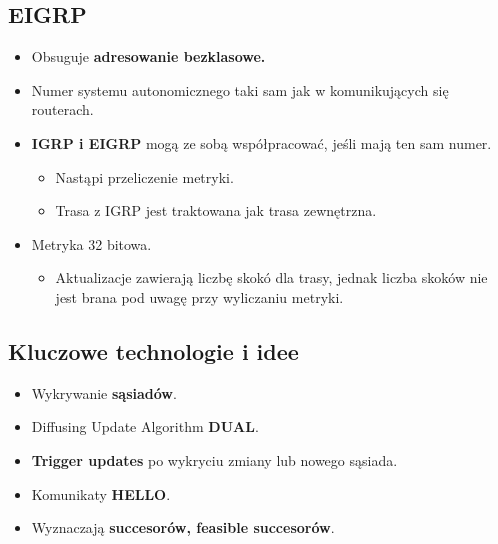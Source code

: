 \documentclass[../sk-egzamin.tex]{subfiles}
\begin{document}

\subsection*{EIGRP}
\begin{itemize}
    \item Obsuguje \textbf{adresowanie bezklasowe.}
    \item Numer systemu autonomicznego taki sam jak w komunikujących się
    routerach.
    \item \textbf{IGRP i EIGRP} mogą ze sobą współpracować, jeśli mają ten sam
    numer.
    \begin{itemize}
        \item Nastąpi przeliczenie metryki.
        \item Trasa z IGRP jest traktowana jak trasa zewnętrzna.
    \end{itemize}
    \item Metryka 32 bitowa.
    \begin{itemize}
        \item Aktualizacje zawierają liczbę skokó dla trasy, jednak liczba
        skoków nie jest brana pod uwagę przy wyliczaniu metryki.
    \end{itemize}
\end{itemize}

\subsection*{Kluczowe technologie i idee}
\begin{itemize}
    \item Wykrywanie \textbf{sąsiadów}.
    \item Diffusing Update Algorithm \textbf{DUAL}.
    \item \textbf{Trigger updates} po wykryciu zmiany lub nowego sąsiada.
    \item Komunikaty \textbf{HELLO}.
    \item Wyznaczają \textbf{succesorów, feasible succesorów}.
\end{itemize}
\end{document}
